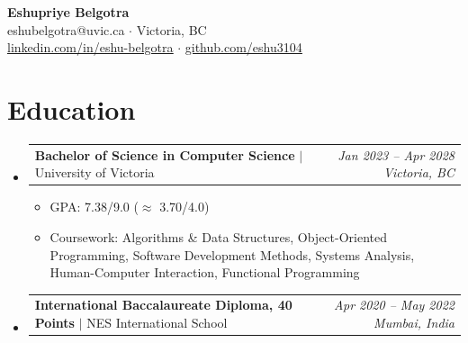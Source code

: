 \documentclass[10pt,letterpaper]{article}
\makeatletter
\newcommand{\resumeSubheading}[4]{
  \vspace{5pt}
  \item[]
    \begin{tabular*}{0.99\textwidth}[t]{l@{\extracolsep{\fill}}r}
      \textbf{\small #1} \textcolor{midgray}{$|$ \small #2} & \textcolor{midgray}{\textit{\small #3 \enspace #4}} \\
    \end{tabular*}
  \vspace{-2pt}
}
\newcommand{\resumeItem}[1]{
  \item {\small #1}
}
\makeatother
\begin{document}
\begin{center}
    {\Large \textbf{Eshupriye Belgotra}} \\[3pt]
    {\small eshubelgotra@uvic.ca \enspace $\cdot$ \enspace Victoria, BC} \\[2pt]
    {\small
      \href{https://linkedin.com/in/eshu-belgotra}{\underline{linkedin.com/in/eshu-belgotra}}
      \enspace $\cdot$ \enspace
      \href{https://github.com/eshu3104}{\underline{github.com/eshu3104}}
    }
\end{center}
\vspace{-6pt}

\section{Education}
\begin{itemize}[leftmargin=0in, label={}]
  \resumeSubheading
    {Bachelor of Science in Computer Science}{University of Victoria}
    {Jan 2023 -- Apr 2028}{Victoria, BC}
  \begin{itemize}
    \resumeItem{GPA: 7.38/9.0 \enspace ($\approx$ 3.70/4.0)}
    \resumeItem{Coursework: Algorithms \& Data Structures, Object-Oriented Programming, Software Development Methods, Systems Analysis, Human-Computer Interaction, Functional Programming}
  \end{itemize}

  \resumeSubheading
    {International Baccalaureate Diploma, 40 Points}{NES International School}
    {Apr 2020 -- May 2022}{Mumbai, India}
\end{itemize}

\end{document}
